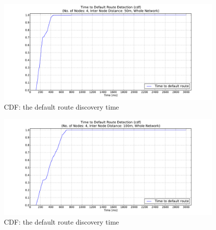 \begin{figure}[htbp]
  \begin{center}
    \leavevmode
      \includegraphics[width=\textwidth]
      {Pics/results/4/MRHOF/line/dist50_montecarlo_cdf_hist.pdf}
   \caption{CDF: the default route discovery time}
    \label{fig:dist50_montecarlo_cdf_hist}
  \end{center}
\end{figure}
  
\begin{figure}[htbp]
  \begin{center}
    \leavevmode
      \includegraphics[width=\textwidth]
      {Pics/results/4/MRHOF/line/dist100_montecarlo_cdf_hist.pdf}
   \caption{CDF: the default route discovery time}
    \label{fig:dist100_montecarlo_cdf_hist}
  \end{center}
\end{figure}

